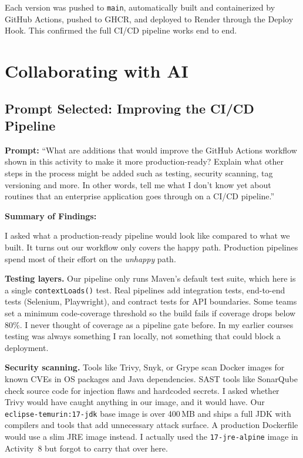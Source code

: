 \documentclass[11pt,letterpaper]{article}
\begin{document}
Each version was pushed to \texttt{main}, automatically built and containerized by GitHub Actions, pushed to GHCR, and deployed to Render through the Deploy Hook. This confirmed the full CI/CD pipeline works end to end.

\section{Collaborating with AI}

\subsection{Prompt Selected: Improving the CI/CD Pipeline}

\textbf{Prompt:} ``What are additions that would improve the GitHub Actions workflow shown in this activity to make it more production-ready? Explain what other steps in the process might be added such as testing, security scanning, tag versioning and more. In other words, tell me what I don't know yet about routines that an enterprise application goes through on a CI/CD pipeline.''

\textbf{Summary of Findings:}

I asked what a production-ready pipeline would look like compared to what we built. It turns out our workflow only covers the happy path. Production pipelines spend most of their effort on the \emph{unhappy} path.

\textbf{Testing layers.} Our pipeline only runs Maven's default test suite, which here is a single \texttt{contextLoads()} test. Real pipelines add integration tests, end-to-end tests (Selenium, Playwright), and contract tests for API boundaries. Some teams set a minimum code-coverage threshold so the build fails if coverage drops below 80\%. I never thought of coverage as a pipeline gate before. In my earlier courses testing was always something I ran locally, not something that could block a deployment.

\textbf{Security scanning.} Tools like Trivy, Snyk, or Grype scan Docker images for known CVEs in OS packages and Java dependencies. SAST tools like SonarQube check source code for injection flaws and hardcoded secrets. I asked whether Trivy would have caught anything in our image, and it would have. Our \texttt{eclipse-temurin:17-jdk} base image is over 400\,MB and ships a full JDK with compilers and tools that add unnecessary attack surface. A production Dockerfile would use a slim JRE image instead. I actually used the \texttt{17-jre-alpine} image in Activity~8 but forgot to carry that over here.
\end{document}

